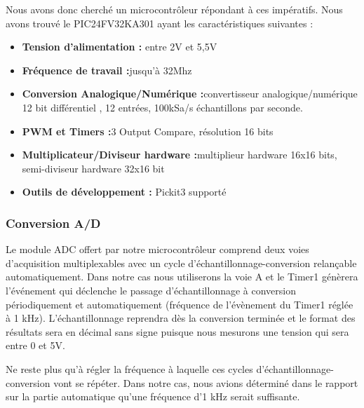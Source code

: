 \documentclass[11pt, french]{article} %
\begin{document}
Nous avons donc cherché un microcontrôleur répondant à ces impératifs. Nous avons trouvé le PIC24FV32KA301 ayant les caractéristiques suivantes :
\begin{itemize}
\item \textbf{Tension d'alimentation :} entre 2V et 5,5V
\vspace{0.5cm}
\item \textbf{Fréquence de travail :}jusqu'à 32Mhz
\vspace{0.5cm}
\item \textbf{Conversion Analogique/Numérique :}convertisseur analogique/numérique 12 bit différentiel , 12 entrées, 100kSa/s échantillons par seconde. 
\vspace{0.5cm}
\item \textbf{PWM et Timers :}3 Output Compare, résolution 16 bits
\vspace{0.5cm}
\item \textbf{Multiplicateur/Diviseur hardware :}multiplieur hardware 16x16 bits, semi-diviseur hardware 32x16 bit
\vspace{0.5cm}
\item \textbf{Outils de développement :} Pickit3 supporté

\end{itemize}

\subsubsection{Conversion A/D}

Le module ADC offert par notre microcontrôleur comprend deux voies d'acquisition multiplexables avec un cycle d'échantillonnage-conversion relançable automatiquement. Dans notre cas nous utiliserons la voie A et le Timer1 génèrera l'événement qui déclenche le passage d'échantillonnage à conversion périodiquement et automatiquement (fréquence de l'évènement du Timer1 réglée à 1 kHz). L'échantillonnage reprendra dès la conversion terminée et le format des résultats sera en décimal sans signe puisque nous mesurons une tension qui sera entre 0 et 5V. 

\vspace{0.5cm}

Ne reste plus qu'à régler la fréquence à laquelle ces cycles d'échantillonnage-conversion vont se répéter. Dans notre cas, nous avions déterminé dans le rapport sur la partie automatique qu'une fréquence d'1 kHz serait suffisante. 

\vspace{0.5cm}
\end{document}
